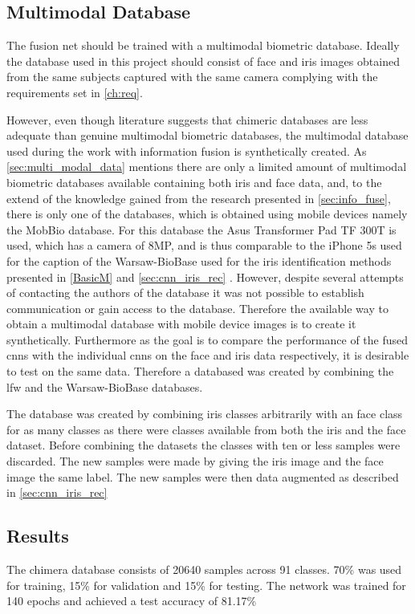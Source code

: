 \clearpage
\subsection{Multimodal Database}
The fusion net should be trained with a multimodal biometric database. Ideally the database used in this project should consist of face and iris images obtained from the same subjects captured with the same camera complying with the requirements set in \autoref{ch:req}. 

However, even though literature suggests that chimeric databases are less adequate than genuine multimodal biometric databases, the multimodal database used during the work with information fusion is synthetically created. As \autoref{sec:multi_modal_data} mentions there are only a limited amount of multimodal biometric databases available containing both iris and face data, and, to the extend of the knowledge gained from the research presented in \autoref{sec:info_fuse}, there is only one of the databases, which is obtained using mobile devices namely the MobBio database. For this database the Asus Transformer Pad TF 300T is used, which has a camera of 8MP, and is thus comparable to the iPhone 5s used for the caption of the Warsaw-BioBase used for the iris identification methods presented in \autoref{BasicM} and \autoref{sec:cnn_iris_rec} \citep{Sequeira2014}. However, despite several attempts of contacting the authors of the database it was not possible to establish communication or gain access to the database. Therefore the available way to obtain a multimodal database with mobile device images is to create it synthetically. Furthermore as the goal is to compare the performance of the fused \gls{cnn}s with the individual \gls{cnn}s on the face and iris data respectively, it is desirable to test on the same data. Therefore a databased was created by combining the \gls{lfw} and the Warsaw-BioBase databases. 

The database was created by combining iris classes arbitrarily with an face class for as many classes as there were classes available from both the iris and the face dataset. Before combining the datasets the classes with ten or less samples were discarded. The new samples were made by giving the iris image and the face image the same label. The new samples were then data augmented as described in \autoref{sec:cnn_iris_rec}

\subsection{Results}
The chimera database consists of 20640 samples across 91 classes. 70\% was used for training, 15\% for validation and 15\% for testing. The network was trained for 140 epochs and achieved a test accuracy of 81.17\%

